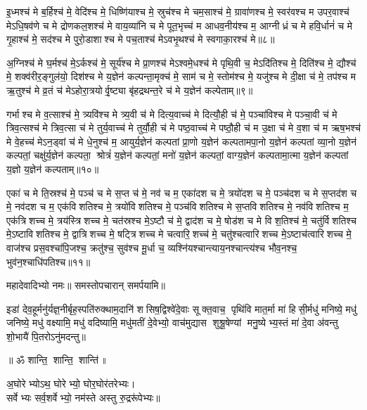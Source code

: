 इ॒ध्मश्च॑ मे ब॒र्हिश्च॑ मे॒ वेदि॑श्च मे॒ धिष्णि॑याश्च मे॒ स्रुच॑श्च मे चम॒साश्च॑ मे॒ ग्रावा॑णश्च मे॒ स्वर॑वश्च म उपर॒वाश्च॑ मेऽधि॒षव॑णे च मे द्रोणकल॒शश्च॑ मे वाय॒व्या॑नि च मे पूत॒भृच्च॑ म आधव॒नीय॑श्च म॒ आग्नीध्रं च मे हवि॒र्धानं॑ च मे गृ॒हाश्च॑ मे॒ सद॑श्च मे पुरो॒डाशाश्च मे पच॒ताश्च॑ मेऽवभृ॒थश्च॑ मे स्वगाका॒रश्च॑ मे॥८॥ 

अ॒ग्निश्च॑ मे घ॒र्मश्च॑ मे॒ऽर्कश्च॑ मे॒ सूर्य॑श्च मे प्रा॒णश्च॑ मेऽश्वमे॒धश्च॑ मे पृथि॒वी च॒ मेऽदि॑तिश्च मे॒ दिति॑श्च मे॒ द्यौश्च॑ मे॒ शक्व॑रीर॒ङ्गुल॑यो॒ दिश॑श्च मे य॒ज्ञेन॑ कल्पन्ता॒मृक्च॑ मे॒ साम॑ च मे॒ स्तोम॑श्च मे॒ यजु॑श्च मे दी॒क्षा च॑ मे॒ तप॑श्च म ऋ॒तुश्च॑ मे व्र॒तं च॑ मेऽहोरा॒त्रयोर्वृ॒ष्ट्या बृ॑हद्रथन्त॒रे च॑ मे य॒ज्ञेन॑ कल्पेताम्॥९॥ 

गर्भाश्च मे व॒त्साश्च॑ मे॒ त्र्यवि॑श्च मे त्र्य॒वी च॑ मे दित्य॒वाच्च॑ मे दित्यौ॒ही च॑ मे॒ पञ्चा॑विश्च मे पञ्चा॒वी च॑ मे त्रिव॒त्सश्च॑ मे त्रिव॒त्सा च॑ मे तुर्य॒वाच्च॑ मे तुर्यौ॒ही च॑ मे पष्ठ॒वाच्च॑ मे पष्ठौ॒ही च॑ म उ॒क्षा च॑ मे व॒शा च॑ म ऋष॒भश्च॑ मे वे॒हच्च॑ मेऽन॒ड्वां च॑ मे धे॒नुश्च॑ म॒ आयुर्य॒ज्ञेन॑ कल्पतां प्रा॒णो य॒ज्ञेन॑ कल्पतामपा॒नो य॒ज्ञेन॑ कल्पतां व्या॒नो य॒ज्ञेन॑ कल्पतां॒ चक्षु॑र्य॒ज्ञेन॑ कल्पता॒ श्रोत्रं॑ य॒ज्ञेन॑ कल्पतां॒ मनो॑ य॒ज्ञेन॑ कल्पतां॒ वाग्य॒ज्ञेन॑ कल्पतामा॒त्मा य॒ज्ञेन॑ कल्पतां य॒ज्ञो य॒ज्ञेन॑ कल्पताम्॥१०॥ 

एका॑ च मे ति॒स्रश्च॑ मे॒ पञ्च॑ च मे स॒प्त च॑ मे॒ नव॑ च म॒ एका॑दश च मे॒ त्रयो॑दश च मे॒ पञ्च॑दश च मे स॒प्तद॑श च मे॒ नव॑दश च म॒ एक॑विशतिश्च मे॒ त्रयो॑विशतिश्च मे॒ पञ्च॑विशतिश्च मे स॒प्तविशतिश्च मे॒ नव॑विशतिश्च म॒ एक॑त्रिशच्च मे॒ त्रय॑स्त्रिशच्च मे॒ चत॑स्रश्च मे॒ऽष्टौ च॑ मे॒ द्वाद॑श च मे॒ षोड॑श च मे विश॒तिश्च॑ मे॒ चतु॑र्विशतिश्च मे॒ऽष्टाविशतिश्च मे॒ द्वात्रिशच्च मे॒ षट्त्रिशच्च मे चत्वारि॒शच्च॑ मे॒ चतु॑श्चत्वारिशच्च मे॒ऽष्टाच॑त्वारिशच्च मे॒ वाज॑श्च प्रस॒वश्चा॑पि॒जश्च॒ क्रतु॑श्च॒ सुव॑श्च मू॒र्धा च॒ व्यश्नि॑यश्चान्त्याय॒नश्चान्त्य॑श्च भौव॒नश्च॒ भुव॑न॒श्चाधि॑पतिश्च॥११॥ 

महादेवादिभ्यो नमः॥ समस्तोपचारान् समर्पयामि॥

इडा॑ देव॒हूर्मनु॑र्यज्ञ॒नीर्बृह॒स्पति॑रुक्थाम॒दानि॑ शसिष॒द्विश्वे॑दे॒वाः सूक्त॒वाच॒ पृथि॑वि मात॒र्मा मा॑ हिसी॒र्मधु॑ मनिष्ये॒ मधु॑ जनिष्ये॒ मधु॑ वक्ष्यामि॒ मधु॑ वदिष्यामि॒ मधु॑मतीं दे॒वेभ्यो॒ वाच॑मुद्यास शुश्रू॒षेण्यां मनु॒ष्येभ्य॒स्तं मा॑ दे॒वा अ॑वन्तु शो॒भायै॑ पि॒तरोऽनु॑मदन्तु॥ 

\centerline{॥ ॐ शान्ति॒ शान्ति॒ शान्ति॑॥}

{\small \closesection}

अ॒घोरेभ्योऽथ॒ घोरेभ्यो॒ घोर॒घोर॑तरेभ्यः।\\
सर्वेभ्यः सर्व॒शर्वेभ्यो॒ नम॑स्ते अस्तु रु॒द्ररू॑पेभ्यः॥


